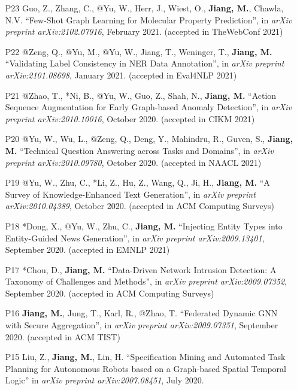 \documentclass[10pt]{article}
\newenvironment{myindentpar}[1]%
{\begin{list}{}%
         {\setlength{\leftmargin}{#1}}%
         \item[]%
}
{\end{list}}
\newcounter{list}
\begin{document}
\begin{myindentpar}{0.00cm}
{\begin{enumerate}[leftmargin=.5cm]
\item[P23] Guo, Z., Zhang, C., @Yu, W., Herr, J., Wiest, O., \textbf{Jiang, M.}, Chawla, N.V. ``Few-Shot Graph Learning for Molecular Property Prediction'', in \textit{arXiv preprint arXiv:2102.07916}, February 2021. (accepted in TheWebConf 2021)

\item[P22] @Zeng, Q., @Yu, M., @Yu, W., Jiang, T., Weninger, T., \textbf{Jiang, M.} ``Validating Label Consistency in NER Data Annotation'', in \textit{arXiv preprint arXiv:2101.08698}, January 2021. (accepted in Eval4NLP 2021)

\item[P21] @Zhao, T., *Ni, B., @Yu, W., Guo, Z., Shah, N., \textbf{Jiang, M.} ``Action Sequence Augmentation for Early Graph-based Anomaly Detection'', in \textit{arXiv preprint arXiv:2010.10016}, October 2020. (accepted in CIKM 2021)

\item[P20] @Yu, W., Wu, L., @Zeng, Q., Deng, Y., Mahindru, R., Guven, S., \textbf{Jiang, M.} ``Technical Question Answering across Tasks and Domains'', in \textit{arXiv preprint arXiv:2010.09780}, October 2020. (accepted in NAACL 2021)

\item[P19] @Yu, W., Zhu, C., *Li, Z., Hu, Z., Wang, Q., Ji, H., \textbf{Jiang, M.} ``A Survey of Knowledge-Enhanced Text Generation'', in \textit{arXiv preprint arXiv:2010.04389}, October 2020. (accepted in ACM Computing Surveys)
		
\item[P18] *Dong, X., @Yu, W., Zhu, C., \textbf{Jiang, M.} ``Injecting Entity Types into Entity-Guided News Generation'', in \textit{arXiv preprint arXiv:2009.13401}, September 2020. (accepted in EMNLP 2021)
		
\item[P17] *Chou, D., \textbf{Jiang, M.} ``Data-Driven Network Intrusion Detection: A Taxonomy of Challenges and Methods'', in \textit{arXiv preprint arXiv:2009.07352}, September 2020. (accepted in ACM Computing Surveys)

\item[P16] \textbf{Jiang, M.}, Jung, T., Karl, R., @Zhao, T. ``Federated Dynamic GNN with Secure Aggregation'', in \textit{arXiv preprint arXiv:2009.07351}, September 2020. (accepted in ACM TIST)

\item[P15] Liu, Z., \textbf{Jiang, M.}, Lin, H. ``Specification Mining and Automated Task Planning for Autonomous Robots based on a Graph-based Spatial Temporal Logic'' in \textit{arXiv preprint arXiv:2007.08451}, July 2020.


\end{enumerate}}
\end{myindentpar}
\end{document}
